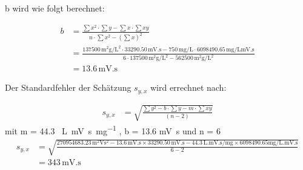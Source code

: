 \documentclass{article}
\begin{document}
  b wird wie folgt berechnet:

\begin{align*}
  b &= \frac{\sum x^2 \cdot \sum y - \sum x \cdot \sum x y}{n \cdot \sum x^2 - (\sum x )^2}\\
    & = \frac{\num{137500} \, \si{\square\milli\gram\per\square\liter} \cdot  \num{33290.50} \,  \si{\milli\volt.\second} -   750 \, \si{\milli\gram\per\liter} \cdot  \num{6098490.65} \, \si{\milli\gram\per\liter} \si{\milli\volt.\second}}{6  \cdot \num{137500} \, \si{\square\milli\gram\per\square\liter}  - \num{562500} \, \si{\square\milli\gram\per\square\liter}}\\
    &  = 13.6 \, \si{\milli\volt.\second}
\end{align*}



  Der Standardfehler der Schätzung $s_{y,x}$ wird errechnet nach:

\begin{align}
 s_{y,x} &= \sqrt{\frac{\sum y^2 - b \cdot \sum y - m \cdot \sum xy}{(n-2)}}
\end{align}
mit m = 44.3 \, \si{\liter.\milli\volt\second\per\milli\gram} , b = 13.6 \si{\milli\volt.\second} und n = 6
\begin{align*}
  s_{y,x} &=\sqrt{ \frac{ \num{270954683.23} \, \si{\square\milli\volt} \si{\square\second} - 13.6 \, \si{\milli\volt.\second} \times \num{33290.50} \, \si{\milli\volt.\second}
   -  44.3 \, \si{\liter.\milli\volt.\second\per\milli\gram} \times \num{6098490.65} \si{\milli\gram\per\liter.\milli\volt.\second} } {6-2}} \\
  &= 343 \, \si{\milli\volt.\second}
\end{align*}
\end{document}
